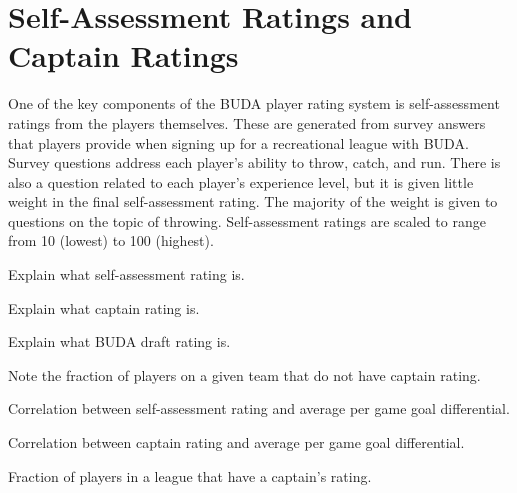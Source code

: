 \section{Self-Assessment Ratings and Captain Ratings}\label{sec:self_rating}

One of the key components of the BUDA player rating system is self-assessment ratings from the players themselves.  These are generated from survey answers that players provide when signing up for a recreational league with BUDA. Survey questions address each player's ability to throw, catch, and run.  There is also a question related to each player's experience level, but it is given little weight in the final self-assessment rating. The majority of the weight is given to questions on the topic of throwing. Self-assessment ratings are scaled to range from 10 (lowest) to 100 (highest).

Explain what self-assessment rating is.

Explain what captain rating is.

Explain what BUDA draft rating is.

Note the fraction of players on a given team that do not have captain rating.

Correlation between self-assessment rating and average per game goal differential.

Correlation between captain rating and average per game goal differential.

Fraction of players in a league that have a captain's rating.